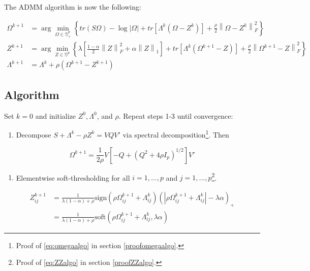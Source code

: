\documentclass[11pt,]{report}
\providecommand{\tightlist}{%
  \setlength{\itemsep}{0pt}\setlength{\parskip}{0pt}}
\begin{document}
The ADMM algorithm is now the following:

\begin{align}
  \Omega^{k + 1} &= \arg\min_{\Omega \in \mathbb{S}_{+}^{p}}\left\{ tr\left(S\Omega\right) - \log\left|\Omega\right| + tr\left[\Lambda^{k}\left(\Omega - Z^{k}\right)\right] + \frac{\rho}{2}\left\| \Omega - Z^{k} \right\|_{F}^{2} \right\} \label{eq:omegaauglagrangee} \\
  Z^{k + 1} &= \arg\min_{Z \in \mathbb{S}^{p}}\left\{ \lambda\left[ \frac{1 - \alpha}{2}\left\| Z \right\|_{F}^{2} + \alpha\left\| Z \right\|_{1} \right] + tr\left[\Lambda^{k}\left(\Omega^{k + 1} - Z\right)\right] + \frac{\rho}{2}\left\| \Omega^{k + 1} - Z \right\|_{F}^{2} \right\} \label{eq:ZZauglagrange} \\
  \Lambda^{k + 1} &= \Lambda^{k} + \rho\left( \Omega^{k + 1} - Z^{k + 1} \right) \label{eq:lamauglagrange}
\end{align}

\hypertarget{algorithm}{%
\subsection{Algorithm}\label{algorithm}}

Set \(k = 0\) and initialize \(Z^{0}, \Lambda^{0}\), and \(\rho\). Repeat steps 1-3 until convergence:

\begin{enumerate}
\def\labelenumi{\arabic{enumi}.}
\tightlist
\item
  Decompose \(S + \Lambda^{k} - \rho Z^{k} = VQV'\) via spectral decomposition\footnote{Proof of \eqref{eq:omegaalgo} in section \ref{proofomegaalgo}.}. Then
\end{enumerate}

\begin{equation}
\Omega^{k + 1} = \frac{1}{2\rho}V\left[ -Q + \left( Q^{2} + 4\rho I_{p} \right)^{1/2} \right]V'
\label{eq:omegaalgo}
\end{equation}

\begin{enumerate}
\def\labelenumi{\arabic{enumi}.}
\setcounter{enumi}{1}
\tightlist
\item
  Elementwise soft-thresholding for all \(i = 1,..., p\) and \(j = 1,..., p\)\footnote{Proof of \eqref{eq:ZZalgo} in section \ref{proofZZalgo}.}.
\end{enumerate}

\begin{equation}
\begin{split}
Z_{ij}^{k + 1} &= \frac{1}{\lambda(1 - \alpha) + \rho}\mbox{sign}\left(\rho\Omega_{ij}^{k + 1} + \Lambda_{ij}^{k}\right)\left( \left| \rho\Omega_{ij}^{k + 1} + \Lambda_{ij}^{k} \right| - \lambda\alpha \right)_{+} \\
&= \frac{1}{\lambda(1 - \alpha) + \rho}\mbox{soft}\left(\rho\Omega_{ij}^{k + 1} + \Lambda_{ij}^{k}, \lambda\alpha\right)
\label{eq:ZZalgo}
\end{split}
\end{equation}
\end{document}
